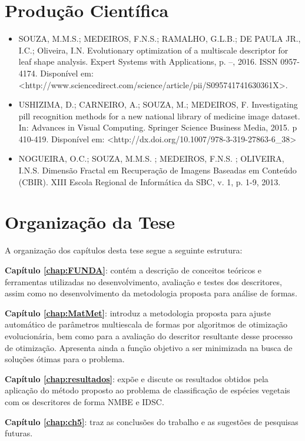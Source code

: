\section {Produção Científica \label{sec:prod_cientif}}
\begin{itemize}

\item SOUZA, M.M.S.; MEDEIROS, F.N.S.; RAMALHO, G.L.B.; DE PAULA JR., I.C.; Oliveira, I.N. Evolutionary optimization of a multiscale descriptor for leaf
shape analysis. Expert Systems with Applications, p. –, 2016. ISSN 0957-4174. Disponível
em: <http://www.sciencedirect.com/science/article/pii/S095741741630361X>.

\item USHIZIMA, D.; CARNEIRO, A.; SOUZA, M.; MEDEIROS, F. Investigating pill recognition methods for a new national library of
medicine image dataset. In: Advances in Visual Computing. Springer Science Business Media, 2015. p 410-419. Disponível em: <http://dx.doi.org/10.1007/978-3-319-27863-6\_38>


\item NOGUEIRA, O.C.; SOUZA, M.M.S. ; MEDEIROS, F.N.S. ; OLIVEIRA, I.N.S. Dimensão Fractal em Recuperação de Imagens Baseadas em Conteúdo (CBIR). XIII Escola Regional de Informática da SBC, v. 1, p. 1-9, 2013.

\end{itemize}
\section{Organização da Tese \label{sec:org}}

A organização dos capítulos desta tese segue a seguinte estrutura:

\noindent \textbf{Capítulo \ref{chap:FUNDA}}: contém a descrição de conceitos teóricos e ferramentas utilizadas no desenvolvimento, avaliação e testes dos descritores, assim como no desenvolvimento da metodologia proposta para análise de formas.

\noindent \textbf{Capítulo \ref{chap:MatMet}}:  introduz a metodologia proposta para ajuste automático de parâmetros multiescala de formas por algoritmos de otimização evolucionária, bem como para a avaliação do descritor resultante desse processo de otimização. Apresenta ainda a função objetivo a ser minimizada na busca de soluções ótimas para o problema.

\noindent \textbf{Capítulo \ref{chap:resultados}}: expõe e discute os resultados obtidos pela aplicação do método proposto ao problema de classificação de espécies vegetais com os descritores de forma \ac{NMBE} e \ac{IDSC}.

\noindent \textbf{Capítulo \ref{chap:ch5}}: traz as conclusões do trabalho e as sugestões de pesquisas futuras. 
